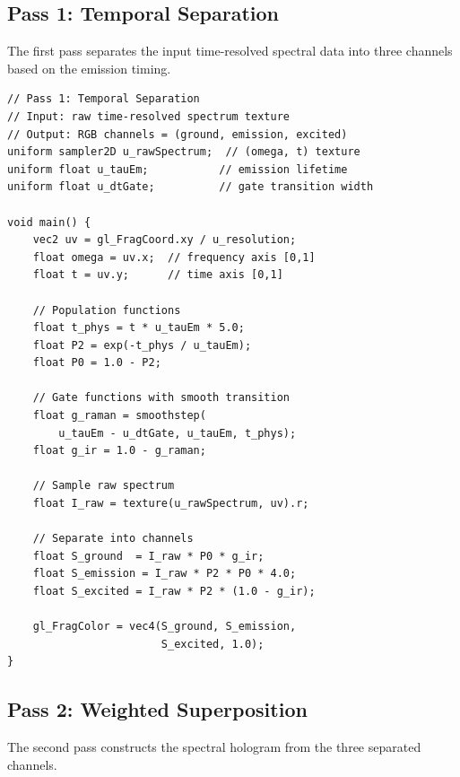 \documentclass[11pt,a4paper]{article}
\theoremstyle{definition}
\theoremstyle{remark}
\begin{document}
\subsection{Pass 1: Temporal Separation}

The first pass separates the input time-resolved spectral data into three channels based on the emission timing.

\begin{lstlisting}[style=glsl, caption={Pass 1: Temporal separation shader}, label={lst:pass1}]
// Pass 1: Temporal Separation
// Input: raw time-resolved spectrum texture
// Output: RGB channels = (ground, emission, excited)
uniform sampler2D u_rawSpectrum;  // (omega, t) texture
uniform float u_tauEm;           // emission lifetime
uniform float u_dtGate;          // gate transition width

void main() {
    vec2 uv = gl_FragCoord.xy / u_resolution;
    float omega = uv.x;  // frequency axis [0,1]
    float t = uv.y;      // time axis [0,1]

    // Population functions
    float t_phys = t * u_tauEm * 5.0;
    float P2 = exp(-t_phys / u_tauEm);
    float P0 = 1.0 - P2;

    // Gate functions with smooth transition
    float g_raman = smoothstep(
        u_tauEm - u_dtGate, u_tauEm, t_phys);
    float g_ir = 1.0 - g_raman;

    // Sample raw spectrum
    float I_raw = texture(u_rawSpectrum, uv).r;

    // Separate into channels
    float S_ground  = I_raw * P0 * g_ir;
    float S_emission = I_raw * P2 * P0 * 4.0;
    float S_excited = I_raw * P2 * (1.0 - g_ir);

    gl_FragColor = vec4(S_ground, S_emission,
                        S_excited, 1.0);
}
\end{lstlisting}

\subsection{Pass 2: Weighted Superposition}

The second pass constructs the spectral hologram from the three separated channels.
\end{document}
